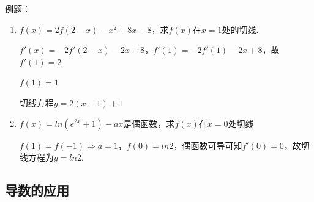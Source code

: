 例题：
\begin{enumerate}
    \item $f(x) = 2f(2-x)-x^2+8x-8$，求$f(x)$在$x = 1$处的切线.
    \begin{jieda}
        $f'(x) = -2f'(2-x)-2x+8$，$f'(1) = -2f'(1)-2x+8$，故$f'(1) = 2$

        $f(1) = 1$

        切线方程$y = 2(x-1)+1$
    \end{jieda}

    \item $f(x) = ln\left(e^{2x}+1\right)-ax$是偶函数，求$f(x)$在$x = 0$处切线
    \begin{jieda}
        $f(1) = f(-1) \Longrightarrow a = 1$，$f(0) = ln2$，偶函数可导可知$f'(0) = 0$，故切线方程为$y = ln2$.
    \end{jieda}
\end{enumerate}

\clearpage
\subsection*{导数的应用}
